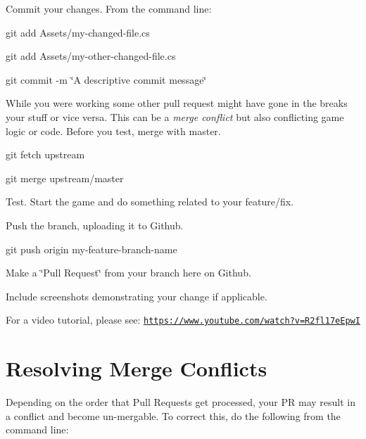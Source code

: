 \begin{DoxyEnumerate}
\begin{DoxyItemize}
\end{DoxyItemize}
\item Commit your changes. From the command line\+:
\begin{DoxyItemize}
\item {\ttfamily git add Assets/my-\/changed-\/file.\+cs}
\item {\ttfamily git add Assets/my-\/other-\/changed-\/file.\+cs}
\item {\ttfamily git commit -\/m \char`\"{}\+A descriptive commit message\char`\"{}}
\end{DoxyItemize}
\item While you were working some other pull request might have gone in the breaks your stuff or vice versa. This can be a {\itshape merge conflict} but also conflicting game logic or code. Before you test, merge with master.
\begin{DoxyItemize}
\item {\ttfamily git fetch upstream}
\item {\ttfamily git merge upstream/master}
\end{DoxyItemize}
\item Test. Start the game and do something related to your feature/fix.
\item Push the branch, uploading it to Github.
\begin{DoxyItemize}
\item {\ttfamily git push origin my-\/feature-\/branch-\/name}
\end{DoxyItemize}
\item Make a \char`\"{}\+Pull Request\char`\"{} from your branch here on Github.
\begin{DoxyItemize}
\item Include screenshots demonstrating your change if applicable.
\end{DoxyItemize}
\item For a video tutorial, please see\+: \href{https://www.youtube.com/watch?v=R2fl17eEpwI}{\tt https\+://www.\+youtube.\+com/watch?v=\+R2fl17e\+EpwI}
\end{DoxyEnumerate}

\section*{Resolving Merge Conflicts}

Depending on the order that Pull Requests get processed, your PR may result in a conflict and become un-\/mergable. To correct this, do the following from the command line\+:

